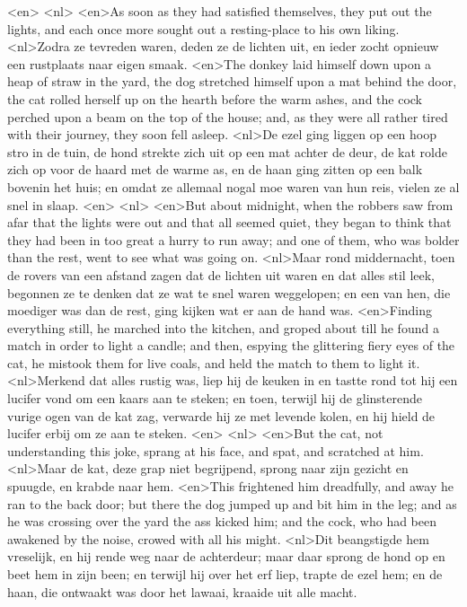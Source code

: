 <en>
<nl>
<en>As soon as they had satisfied themselves, they put out the lights, and each once more sought out a resting-place to his own liking.
<nl>Zodra ze tevreden waren, deden ze de lichten uit, en ieder zocht opnieuw   een rustplaats naar eigen smaak.
<en>The donkey laid himself down upon a heap of straw in the yard, the dog stretched himself upon a mat behind the door, the cat rolled herself up on the hearth before the warm ashes, and the cock perched upon a beam on the top of the house; and, as they were all rather tired with their journey, they soon fell asleep.
<nl>De ezel ging liggen op een hoop stro in de tuin, de hond strekte zich uit op een mat achter de deur, de kat rolde zich op voor de haard met de warme as, en de haan ging zitten op een balk bovenin het huis; en omdat ze allemaal nogal moe waren van hun reis, vielen ze al snel in slaap.
<en>
<nl>
<en>But about midnight, when the robbers saw from afar that the lights were out and that all seemed quiet, they began to think that they had been in too great a hurry to run away; and one of them, who was bolder than the rest, went to see what was going on.
<nl>Maar rond middernacht, toen de rovers van een afstand zagen dat de lichten uit waren en dat alles stil leek, begonnen ze te denken dat ze wat te snel waren weggelopen; en een van hen, die moediger was dan de rest, ging kijken wat er aan de hand was.
<en>Finding everything still, he marched into the kitchen, and groped about till he found a match in order to light a candle; and then, espying the glittering fiery eyes of the cat, he mistook them for live coals, and held the match to them to light it.
<nl>Merkend dat alles rustig was, liep hij de keuken in en tastte rond tot hij een lucifer vond om een kaars aan te steken; en toen, terwijl hij de glinsterende vurige ogen van de kat zag, verwarde hij ze met levende kolen, en hij hield de lucifer erbij om ze aan te steken.
<en>
<nl>
<en>But the cat, not understanding this joke, sprang at his face, and spat, and scratched at him.
<nl>Maar de kat, deze grap niet begrijpend, sprong naar zijn gezicht en spuugde, en krabde naar hem.
<en>This frightened him dreadfully, and away he ran to the back door; but there the dog jumped up and bit him in the leg; and as he was crossing over the yard the ass kicked him; and the cock, who had been awakened by the noise, crowed with all his might.
<nl>Dit beangstigde hem vreselijk, en hij rende weg  naar de achterdeur; maar daar sprong de hond op en beet hem in zijn been; en terwijl hij over het erf liep, trapte de ezel hem; en de haan, die ontwaakt was door het lawaai, kraaide uit alle macht.
